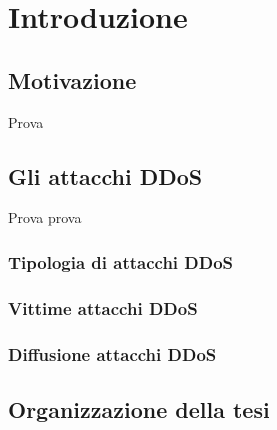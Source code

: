 \chapter{Introduzione}


\section{Motivazione}
Prova 


\section{Gli attacchi DDoS}
Prova prova
\subsection{Tipologia di attacchi DDoS}
\subsection{Vittime attacchi DDoS}
\subsection{Diffusione attacchi DDoS}


\section{Organizzazione della tesi}
